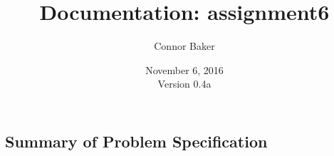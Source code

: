 \documentclass[12pt]{article}
\begin{document}
\null
\nointerlineskip 
\vfill
\let \snewpage \newpage
\let \newpage \relax
    \title{Documentation: assignment6}
    \author{Connor Baker}
    \date{November 6, 2016\\Version 0.4a}
\maketitle
\let \newpage \snewpage
\vfill



\newpage %


\makeatletter
\renewcommand*\l@section{\@dottedtocline{1}{0em}{1.5em}}
\makeatother

\tableofcontents
\clearpage

\begin{center}
\section{Summary of Problem Specification}
\end{center}
\end{document}
